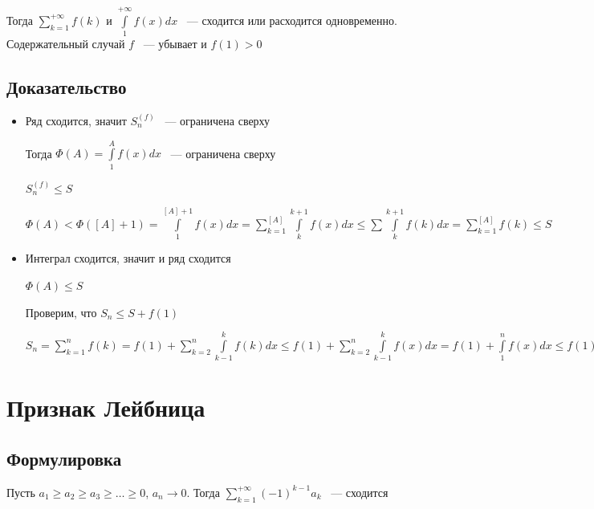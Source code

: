 \documentclass{article}
\begin{document}
            Тогда $\sum\limits^{+\infty}_{k = 1} f(k)$ и $\int\limits^{+\infty}_1 f(x) dx$ ~--- сходится или расходится одновременно. Содержательный случай $f$ ~--- убывает и $f(1) > 0$
            
        \subsection{Доказательство}
        
            \begin{itemize}
            
            \item Ряд сходится, значит $S^{(f)}_n$ ~--- ограничена сверху
            
                Тогда $\Phi(A) = \int\limits^A_1 f(x) dx$ ~--- ограничена сверху
            
                $S^{(f)}_n \leq S$
            
                $\Phi(A) < \Phi([A] + 1) = \int\limits^{[A] + 1}_1 f(x) dx = \sum\limits^{[A]}_{k = 1} \int\limits^{k + 1}_k f(x)dx \leq \sum \int\limits^{k + 1}_k f(k) dx = \sum\limits^{[A]}_{k = 1} f(k) \leq S$
            
            \item Интеграл сходится, значит и ряд сходится
            
                $\Phi(A) \leq S$
            
                Проверим, что $S_n \leq S + f(1)$
            
                $S_n = \sum\limits^n_{k = 1} f(k) = f(1) + \sum\limits^n_{k = 2} \int\limits^k_{k - 1} f(k) dx \leq f(1) + \sum\limits^n_{k = 2} \int\limits^k_{k - 1} f(x) dx = f(1) + \int\limits^n_1 f(x) dx \leq f(1) + S$
                
            \end{itemize}
            
    \newpage
    
    \section{Признак Лейбница}
    
        \subsection{Формулировка}
        
            Пусть $a_1 \geq a_2 \geq a_3 \geq \ldots \geq 0$, $a_n \rightarrow 0$. Тогда $\sum\limits^{+\infty}_{k = 1} (-1)^{k - 1} a_k$ ~--- сходится
            
\end{document}
